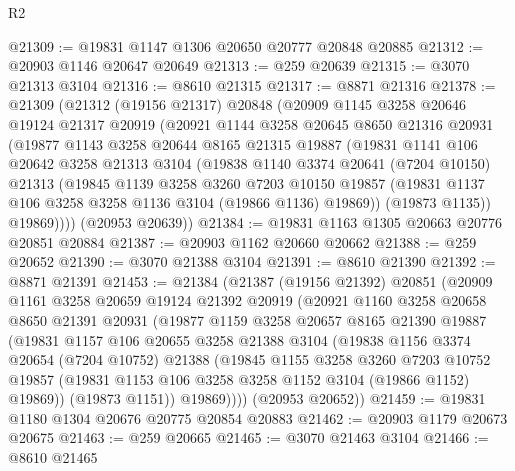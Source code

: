\begin{lexlean}{R2}
\begin{coremodule}
@21309 := @19831 @1147 @1306 @20650 @20777 @20848 @20885
@21312 := @20903 @1146 @20647 @20649
@21313 := @259 @20639
@21315 := @3070 @21313 @3104
@21316 := @8610 @21315
@21317 := @8871 @21316
@21378 := @21309
    (@21312
      (@19156 @21317)
      @20848
      (@20909
        @1145
        @3258
        @20646
        @19124
        @21317
        @20919
        (@20921
          @1144
          @3258
          @20645
          @8650
          @21316
          @20931
          (@19877
            @1143
            @3258
            @20644
            @8165
            @21315
            @19887
            (@19831
              @1141
              @106
              @20642
              @3258
              @21313
              @3104
              (@19838
                @1140
                @3374
                @20641
                (@7204 @10150)
                @21313
                (@19845
                  @1139
                  @3258
                  @3260
                  @7203
                  @10150
                  @19857
                  (@19831 @1137 @106 @3258 @3258 @1136 @3104 (@19866 @1136) @19869))
                (@19873 @1135))
              @19869))))
      (@20953 @20639))
@21384 := @19831 @1163 @1305 @20663 @20776 @20851 @20884
@21387 := @20903 @1162 @20660 @20662
@21388 := @259 @20652
@21390 := @3070 @21388 @3104
@21391 := @8610 @21390
@21392 := @8871 @21391
@21453 := @21384
    (@21387
      (@19156 @21392)
      @20851
      (@20909
        @1161
        @3258
        @20659
        @19124
        @21392
        @20919
        (@20921
          @1160
          @3258
          @20658
          @8650
          @21391
          @20931
          (@19877
            @1159
            @3258
            @20657
            @8165
            @21390
            @19887
            (@19831
              @1157
              @106
              @20655
              @3258
              @21388
              @3104
              (@19838
                @1156
                @3374
                @20654
                (@7204 @10752)
                @21388
                (@19845
                  @1155
                  @3258
                  @3260
                  @7203
                  @10752
                  @19857
                  (@19831 @1153 @106 @3258 @3258 @1152 @3104 (@19866 @1152) @19869))
                (@19873 @1151))
              @19869))))
      (@20953 @20652))
@21459 := @19831 @1180 @1304 @20676 @20775 @20854 @20883
@21462 := @20903 @1179 @20673 @20675
@21463 := @259 @20665
@21465 := @3070 @21463 @3104
@21466 := @8610 @21465

\end{coremodule}
\end{lexlean}
